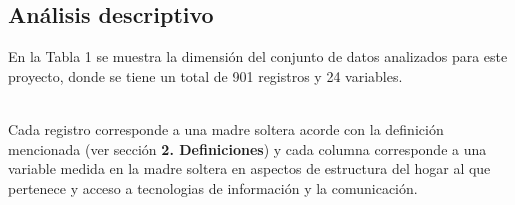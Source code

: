 \documentclass[11pt,twoside]{article}
\begin{document}
\subsection{Análisis descriptivo}
\noindent
En la Tabla 1 se muestra la dimensión del conjunto de datos analizados para este proyecto, donde se tiene un total de 901 registros y 24 variables.
\begin{table}[h]
	\caption{\small{Dimensión de la base de datos.}}
	\label{tabla1}
\end{table}
\\
Cada registro corresponde a una madre soltera acorde con la definición mencionada (ver sección\textbf{ 2. Definiciones}) y cada columna corresponde a una variable medida en la madre soltera en aspectos de estructura del hogar al que pertenece y acceso a tecnologias de información y la comunicación. 
\\
\end{document}
